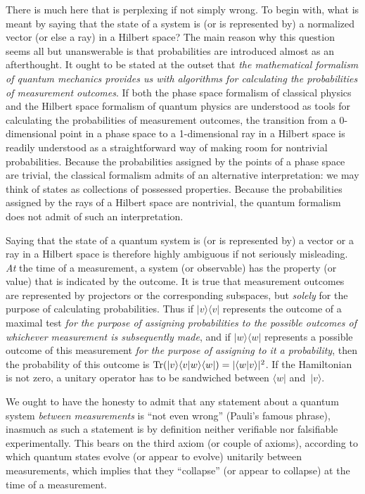 \documentclass[12pt]{article}
\newcommand{\bra}[1]{\langle#1\vert}
\newcommand{\ket}[1]{\vert#1\rangle}
\newcommand{\braket}[2]{\langle#1\vert#2\rangle}
\newcommand{\ketbra}[2]{\vert#1\rangle\langle#2\vert}
\newcommand{\Tr}{\hbox{Tr}}
\begin{document}
There is much here that is perplexing if not simply wrong. To begin with, what is meant by saying that the state of a system is (or is represented by) a normalized vector (or else a ray) in a Hilbert space? The main reason why this question seems all but unanswerable is that probabilities are introduced almost as an afterthought. It ought to be stated at the outset that \textit{the mathematical formalism of quantum mechanics provides us with algorithms for calculating the probabilities of measurement outcomes}. If both the phase space formalism of classical physics and the Hilbert space formalism of quantum physics are understood as tools for calculating the probabilities of measurement outcomes, the transition from a 0-dimensional point in a phase space to a 1-dimensional ray in a Hilbert space is readily understood as a straightforward way of making room for nontrivial probabilities. Because the probabilities assigned by the points of a phase space are trivial, the classical formalism admits of an alternative interpretation: we may think of states as collections of possessed properties. Because the probabilities assigned by the rays of a Hilbert space are nontrivial, the quantum formalism does not admit of such an interpretation.

Saying that the state of a quantum system is (or is represented by) a vector or a ray in a Hilbert space is therefore highly ambiguous if not seriously misleading. \textit{At} the time of a measurement, a system (or observable) has the property (or value) that is indicated by the outcome. It is true that measurement outcomes are represented by projectors or the corresponding subspaces, but \textit{solely} for the purpose of calculating probabilities. Thus if $\ketbra vv$ represents the outcome of a maximal test \textit{for the purpose of assigning probabilities to the possible outcomes of whichever measurement is subsequently made}, and if $\ketbra ww$ represents a possible outcome of this measurement \textit{for the purpose of assigning to it a probability}, then the probability of this outcome is $\Tr(\ket v\braket vw\bra w)=|\braket wv|^2$. If the Hamiltonian is not zero, a unitary operator has to be sandwiched between $\bra w$ and~$\ket v$.

We ought to have the honesty to admit that any statement about a quantum system \textit{between measurements} is ``not even wrong'' (Pauli's famous phrase), inasmuch as such a statement is by definition neither verifiable nor falsifiable experimentally. This bears on the third axiom (or couple of axioms), according to which quantum states evolve (or appear to evolve) unitarily between measurements, which implies that they ``collapse'' (or appear to collapse) at the time of a measurement.
\end{document}
